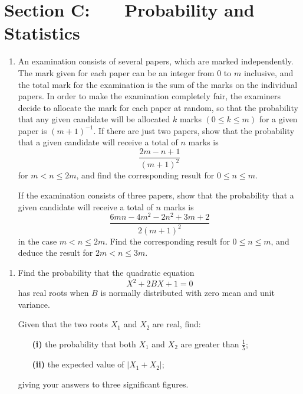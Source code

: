 \documentclass[a4, 11pt]{report}
\newlength{\qspace}
\newcounter{qnumber}
\newenvironment{question}%
 {\vspace{\qspace}
  \begin{enumerate}[\bfseries 1\quad][10]%
    \setcounter{enumi}{\value{qnumber}}%
    \item%
 }
{
  \end{enumerate}
  \filbreak
  \stepcounter{qnumber}
 }
\begin{document}
	\newpage
\section*{Section C: \ \ \ Probability and Statistics}


\begin{question}
An examination consists of several papers, which are marked independently.
The mark given for each paper can be an integer from $0$ to $m$
inclusive, and the total mark for the examination is the sum of the
marks on the individual papers. In order to make the examination completely
fair, the examiners decide to allocate the mark for each paper at
random, so that the probability that any given candidate will be allocated
$k$ marks $(0\leqslant k\leqslant m)$ for a given paper is $(m+1)^{-1}$.
If there are just two papers, show that the probability that a given
candidate will receive a total of $n$ marks is 
\[
\frac{2m-n+1}{\left(m+1\right)^{2}}
\]
for $m<n\leqslant2m$, and find the corresponding result for $0\leqslant n\leqslant m$. 


If the examination consists of three papers, show that the probability
that a given candidate will receive a total of $n$ marks is 
\[
\frac{6mn-4m^{2}-2n^{2}+3m+2}{2\left(m+1\right)^{2}}
\]
in the case $m<n\leqslant2m$. Find the corresponding result for $0\leqslant n\leqslant m$,
and deduce the result for $2m<n\leqslant3m$. 
\end{question}

\begin{question}
Find the probability that the quadratic equation 
\[
X^{2}+2BX+1=0
\]
has real roots when $B$ is normally distributed with zero mean and
unit variance. 


Given that the two roots $X_{1}$ and $X_{2}$ are real, find: 
\begin{itemize}
\setlength{\itemsep}{3mm}
\item[\bf (i)] the probability that both $X_{1}$ and $X_{2}$ are greater than $\frac{1}{5}$;
\item[\bf (ii)] the expected value of $\left|X_{1}+X_{2}\right|$; 
\end{itemize}

giving your answers to three significant figures.
\end{question}
\end{document}
